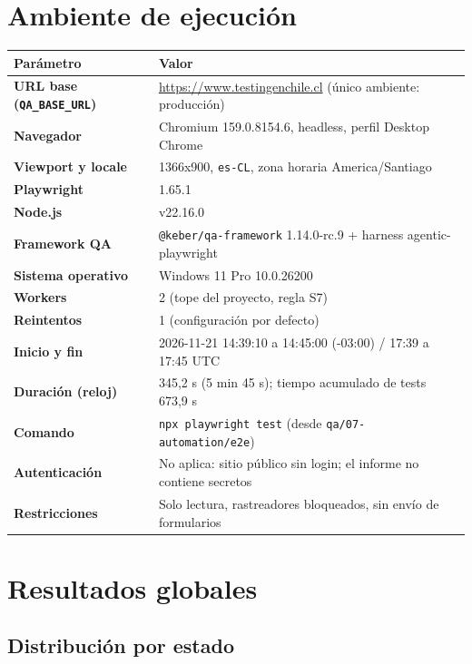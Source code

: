\documentclass[11pt,a4paper]{article}
\newcommand{\code}[1]{\texttt{#1}}
\begin{document}
\section{Ambiente de ejecución}

\begin{center}\small
\begin{tabularx}{\textwidth}{@{}>{\bfseries}p{} X@{}}
\toprule
Parámetro & Valor \\
\midrule
URL base (\code{QA\_BASE\_URL}) & \url{https://www.testingenchile.cl} (único ambiente: producción) \\
Navegador & Chromium 159.0.8154.6, headless, perfil Desktop Chrome \\
Viewport y locale & 1366x900, \code{es-CL}, zona horaria America/Santiago \\
Playwright & 1.65.1 \\
Node.js & v22.16.0 \\
Framework QA & \code{@keber/qa-framework} 1.14.0-rc.9 + harness agentic-playwright \\
Sistema operativo & Windows 11 Pro 10.0.26200 \\
Workers & 2 (tope del proyecto, regla S7) \\
Reintentos & 1 (configuración por defecto) \\
Inicio y fin & 2026-11-21 14:39:10 a 14:45:00 (-03:00) / 17:39 a 17:45 UTC \\
Duración (reloj) & 345,2 s (5 min 45 s); tiempo acumulado de tests 673,9 s \\
Comando & \code{npx playwright test} (desde \code{qa/07-automation/e2e}) \\
Autenticación & No aplica: sitio público sin login; el informe no contiene secretos \\
Restricciones & Solo lectura, rastreadores bloqueados, sin envío de formularios \\
\bottomrule
\end{tabularx}
\end{center}

\section{Resultados globales}

\subsection{Distribución por estado}
\end{document}
